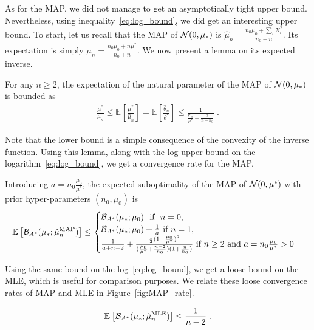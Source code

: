\documentclass{article}
\newcommand*{\expect}[2][]{\ensuremath{\mathbb{E}_{#1} \left[ #2 \right] }} %
\newcommand{\logpart}{A}
\newcommand{\bregmanconj}{\cB_{\logpart^*}}
\newcommand{\natp}{\theta}
\newcommand{\MAPm}{\hat \mu_n}
\newcommand{\MAPt}{\hat \natp_n}
\begin{document}
As for the MAP, we did not manage to get an asymptotically tight upper bound. Nevertheless, using inequality~\eqref{eq:log_bound}, we did get an interesting upper bound. 
To start, let us recall that the MAP of ${\mathcal N}(0,\mu_*)$ is $\hat \mu_n = \frac{n_0 \mu_0 + \sum_i X_i^2}{n_0 + n}$.
Its expectation is simply $\mu_n= \frac{n_0 \mu_0 + n \mu^*}{n_0 + n}$.
We now present a lemma on its expected inverse.
\begin{lemma}
	For any $n\geq 2$, the expectation of the natural parameter of the MAP of ${\mathcal N}(0,\mu_*)$ is bounded as
	\begin{align}
		\frac{\mu^*}{\mu_n}
		\leq \expect{\frac{\mu^*}{\MAPm}} 
		= \expect{\frac{\MAPt}{\natp^*}} 
		\leq \frac{1}{\frac{\mu_n}{\mu^*} - \frac{2}{n+n_0}} \; .
	\label{eq:theta_expectation_bound}
	\end{align}
\end{lemma}
Note that the lower bound is a simple consequence of the convexity of the inverse function. 
Using this lemma, along with the log upper bound on the logarithm~\eqref{eq:log_bound}, we get a convergence rate for the MAP. 
\begin{example}
\begin{theorem}
 Introducing $a=n_0 \frac {\mu_0 }{ \mu^* }$, the expected suboptimality of the MAP of ${\mathcal N}(0,\mu^*)$ with prior hyper-parameters $(n_0,\mu_0)$ is
 \begin{equation}
	\expect{\bregmanconj( \mu_*; \hat \mu_n^\text{MAP})}
	\leq \begin{cases}
		\bregmanconj( \mu_*; \mu_0) \ \text{ if } \ n=0, \\
		\bregmanconj( \mu_*; \mu_0) + \inv{a} \ \text{if}\ n=1,\\
		\frac{1}{a+n-2} + \frac{\half(1 - \frac{\mu_0}{\mu^*})^2}{(\frac{\mu_0}{\mu^*}+\frac{n-2}{n_0})(1 + \frac{n}{n_0} )} \ \text{if}\  n\geq 2 \ \text{and}\ a=n_0 \frac{\mu_0}{\mu^*} >0
	\end{cases}
	\label{eq:MAP_rate}
\end{equation}
\end{theorem}
\end{example}
Using the same bound on the log~\eqref{eq:log_bound}, we  get a loose bound on the MLE, which is useful for comparison purposes.
We relate these loose convergence rates of MAP and MLE in Figure~\ref{fig:MAP_rate}.
\begin{example}
\begin{corollary}
\begin{equation}
	\expect{\bregmanconj( \mu_*; \hat \mu_n^\text{MLE}) }
	\leq \inv{n-2} \; .
	\label{eq:MLE_loose_rate}
\end{equation}
\end{corollary}
\end{example}
\end{document}
